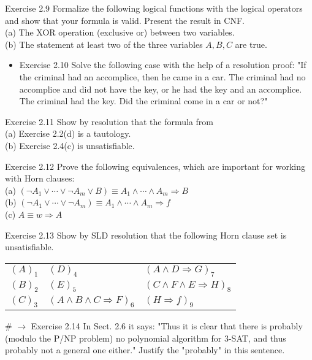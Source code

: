 \documentclass[10pt]{article}
\begin{document}
Exercise 2.9 Formalize the following logical functions with the logical operators and show that your formula is valid. Present the result in CNF.\\
(a) The XOR operation (exclusive or) between two variables.\\
(b) The statement at least two of the three variables $A, B, C$ are true.

\begin{itemize}
  \item Exercise 2.10 Solve the following case with the help of a resolution proof: "If the criminal had an accomplice, then he came in a car. The criminal had no accomplice and did not have the key, or he had the key and an accomplice. The criminal had the key. Did the criminal come in a car or not?"
\end{itemize}

Exercise 2.11 Show by resolution that the formula from\\
(a) Exercise 2.2(d) is a tautology.\\
(b) Exercise 2.4(c) is unsatisfiable.

Exercise 2.12 Prove the following equivalences, which are important for working with Horn clauses:\\
(a) $\left(\neg A_{1} \vee \cdots \vee \neg A_{m} \vee B\right) \equiv A_{1} \wedge \cdots \wedge A_{m} \Rightarrow B$\\
(b) $\left(\neg A_{1} \vee \cdots \vee \neg A_{m}\right) \equiv A_{1} \wedge \cdots \wedge A_{m} \Rightarrow f$\\
(c) $A \equiv w \Rightarrow A$

Exercise 2.13 Show by SLD resolution that the following Horn clause set is unsatisfiable.

\begin{center}
\begin{tabular}{lll}
$(A)_{1}$ & $(D)_{4}$ & $(A \wedge D \Rightarrow G)_{7}$ \\
$(B)_{2}$ & $(E)_{5}$ & $(C \wedge F \wedge E \Rightarrow H)_{8}$ \\
$(C)_{3}$ & $(A \wedge B \wedge C \Rightarrow F)_{6}$ & $(H \Rightarrow f)_{9}$ \\
\end{tabular}
\end{center}

\# $\rightarrow$ Exercise 2.14 In Sect. 2.6 it says: "Thus it is clear that there is probably (modulo the P/NP problem) no polynomial algorithm for 3-SAT, and thus probably not a general one either." Justify the "probably" in this sentence.
\end{document}

